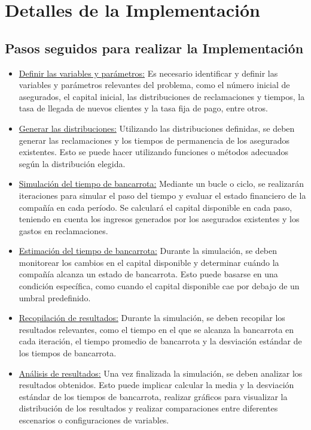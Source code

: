 \documentclass{article}
\begin{document}
\section{Detalles de la Implementación}
 \subsection{Pasos seguidos para realizar la Implementación}
 \begin{itemize}
    \item \underline{Definir las variables y parámetros:} Es necesario identificar y definir las variables y parámetros relevantes del problema, como el número inicial de asegurados, el capital inicial, las distribuciones de reclamaciones y tiempos, la tasa de llegada de nuevos clientes y la tasa fija de pago, entre otros.
    \item \underline{Generar las distribuciones:} Utilizando las distribuciones definidas, se deben generar las reclamaciones y los tiempos de permanencia de los asegurados existentes. Esto se puede hacer utilizando funciones o métodos adecuados según la distribución elegida.
    \item \underline{Simulación del tiempo de bancarrota:} Mediante un bucle o ciclo, se realizarán iteraciones para simular el paso del tiempo y evaluar el estado financiero de la compañía en cada período. Se calculará el capital disponible en cada paso, teniendo en cuenta los ingresos generados por los asegurados existentes y los gastos en reclamaciones.
    \item \underline{Estimación del tiempo de bancarrota:} Durante la simulación, se deben monitorear los cambios en el capital disponible y determinar cuándo la compañía alcanza un estado de bancarrota. Esto puede basarse en una condición específica, como cuando el capital disponible cae por debajo de un umbral predefinido.
    \item \underline{Recopilación de resultados:} Durante la simulación, se deben recopilar los resultados relevantes, como el tiempo en el que se alcanza la bancarrota en cada iteración, el tiempo promedio de bancarrota y la desviación estándar de los tiempos de bancarrota.
    \item \underline{Análisis de resultados:} Una vez finalizada la simulación, se deben analizar los resultados obtenidos. Esto puede implicar calcular la media y la desviación estándar de los tiempos de bancarrota, realizar gráficos para visualizar la distribución de los resultados y realizar comparaciones entre diferentes escenarios o configuraciones de variables.
 \end{itemize}
\end{document}
